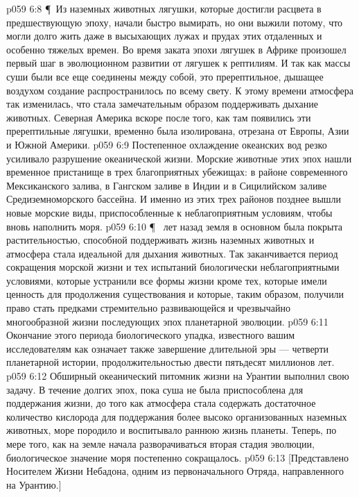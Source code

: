 \vs p059 6:8 \P\ Из наземных животных лягушки, которые достигли расцвета в предшествующую эпоху, начали быстро вымирать, но они выжили потому, что могли долго жить даже в высыхающих лужах и прудах этих отдаленных и особенно тяжелых времен. Во время заката эпохи лягушек в Африке произошел первый шаг в эволюционном развитии от лягушек к рептилиям. И так как массы суши были все еще соединены между собой, это пререптильное, дышащее воздухом создание распространилось по всему свету. К этому времени атмосфера так изменилась, что стала замечательным образом поддерживать дыхание животных. Северная Америка вскоре после того, как там появились эти пререптильные лягушки, временно была изолирована, отрезана от Европы, Азии и Южной Америки.
\vs p059 6:9 Постепенное охлаждение океанских вод резко усиливало разрушение океанической жизни. Морские животные этих эпох нашли временное пристанище в трех благоприятных убежищах: в районе современного Мексиканского залива, в Гангском заливе в Индии и в Сицилийском заливе Средиземноморского бассейна. И именно из этих трех районов позднее вышли новые морские виды, приспособленные к неблагоприятным условиям, чтобы вновь наполнить моря.
\vs p059 6:10 \P\  лет назад земля в основном была покрыта растительностью, способной поддерживать жизнь наземных животных и атмосфера стала идеальной для дыхания животных. Так заканчивается период сокращения морской жизни и тех испытаний биологически неблагоприятными условиями, которые устранили все формы жизни кроме тех, которые имели ценность для продолжения существования и которые, таким образом, получили право стать предками стремительно развивающейся и чрезвычайно многообразной жизни последующих эпох планетарной эволюции.
\vs p059 6:11 Окончание этого периода биологического упадка, известного вашим исследователям как  означает также завершение длительной  эры --- четверти планетарной истории, продолжительностью двести пятьдесят миллионов лет.
\vs p059 6:12 Обширный океанический питомник жизни на Урантии выполнил свою задачу. В течение долгих эпох, пока суша не была приспособлена для поддержания жизни, до того как атмосфера стала содержать достаточное количество кислорода для поддержания более высоко организованных наземных животных, море породило и воспитывало раннюю жизнь планеты. Теперь, по мере того, как на земле начала разворачиваться вторая стадия эволюции, биологическое значение моря постепенно сокращалось.
\vs p059 6:13 [Представлено Носителем Жизни Небадона, одним из первоначального Отряда, направленного на Урантию.]
